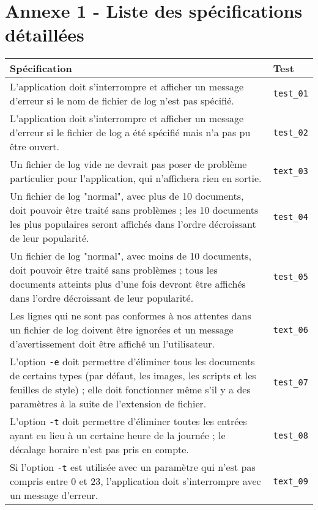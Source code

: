 \documentclass[11pt,a4paper]{article}
\begin{document}
	\pagebreak
	\section*{Annexe 1 - Liste des spécifications détaillées}
	\label{sec:annexe_1}
	
	\begin{center}
		\begin{table}[!h]
			\begin{tabularx}{\textwidth}{ | X | p{1.5cm} | }
				\hline
				Spécification & Test \\ \hline
				L'application doit s'interrompre et afficher un message d'erreur si le nom de fichier de log n'est pas spécifié. & \texttt{test\_01} \\ \hline
				L'application doit s'interrompre et afficher un message d'erreur si le fichier de log a été spécifié mais n'a pas pu être ouvert. & \texttt{test\_02} \\ \hline
				Un fichier de log vide ne devrait pas poser de problème particulier pour l'application, qui n'affichera rien en sortie. & \texttt{text\_03} \\ \hline
				Un fichier de log "normal", avec plus de 10 documents, doit pouvoir être traité sans problèmes ; les 10 documents les plus populaires seront affichés dans l'ordre décroissant de leur popularité. & \texttt{test\_04} \\ \hline
				Un fichier de log "normal", avec moins de 10 documents, doit pouvoir être traité sans problèmes ; tous les documents atteints plus d'une fois devront être affichés dans l'ordre décroissant de leur popularité. & \texttt{test\_05} \\ \hline
				Les lignes qui ne sont pas conformes à nos attentes dans un fichier de log doivent être ignorées et un message d'avertissement doit être affiché un l'utilisateur. & \texttt{text\_06} \\ \hline
				L'option \texttt{-e} doit permettre d'éliminer tous les documents de certains types (par défaut, les images, les scripts et les feuilles de style) ; elle doit fonctionner même s'il y a des paramètres à la suite de l'extension de fichier. & \texttt{test\_07} \\ \hline
				L'option \texttt{-t} doit permettre d'éliminer toutes les entrées ayant eu lieu à un certaine heure de la journée ; le décalage horaire n'est pas pris en compte. & \texttt{test\_08} \\ \hline
				Si l'option \texttt{-t} est utilisée avec un paramètre qui n'est pas compris entre 0 et 23, l'application doit s'interrompre avec un message d'erreur. & \texttt{text\_09} \\ \hline

\end{tabularx}
\end{table}
\end{center}
\end{document}

